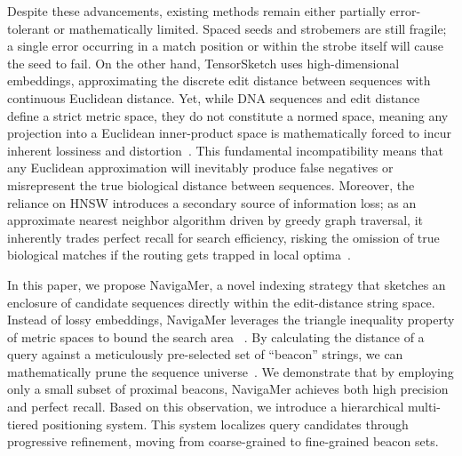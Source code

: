 \documentclass[unnumsec,webpdf,contemporary,large]{oup-authoring-template}%
\theoremstyle{thmstyleone}%
\theoremstyle{thmstyletwo}%
\theoremstyle{thmstylethree}%
\begin{document}
Despite these advancements, existing methods remain either partially error-tolerant or mathematically limited.
Spaced seeds and strobemers are still fragile; a single error occurring in a match position or within the strobe itself will cause the seed to fail.
On the other hand, TensorSketch uses high-dimensional embeddings, approximating the discrete edit distance between sequences with continuous Euclidean distance. 
Yet, while DNA sequences and edit distance define a strict metric space, they do not constitute a normed space, meaning any projection into a Euclidean inner-product space is mathematically forced to incur inherent lossiness and distortion~\citep{ostrovsky2007low, yuan2025melo, marccais2019locality}. 
This fundamental incompatibility means that any Euclidean approximation will inevitably produce false negatives or misrepresent the true biological distance between sequences.
Moreover, the reliance on HNSW introduces a secondary source of information loss; as an approximate nearest neighbor algorithm driven by greedy graph traversal, it inherently trades perfect recall for search efficiency, risking the omission of true biological matches if the routing gets trapped in local optima~\citep{munyampirwa2024down}.

In this paper, we propose NavigaMer, a novel indexing strategy that sketches an enclosure of candidate sequences directly within the edit-distance string space.
Instead of lossy embeddings, NavigaMer leverages the triangle inequality property of metric spaces to bound the search area ~\citep{kulis2013metric}.
By calculating the distance of a query against a meticulously pre-selected set of ``beacon'' strings,
we can mathematically prune the sequence universe~\citep{chavez2001searching, yianilos1993data, chen2017pivot}.
We demonstrate that by employing only a small subset of proximal beacons, NavigaMer achieves both high precision and perfect recall.
Based on this observation, we introduce a hierarchical multi-tiered positioning system.
This system localizes query candidates through progressive refinement,
moving from coarse-grained to fine-grained beacon sets.

\end{document}
